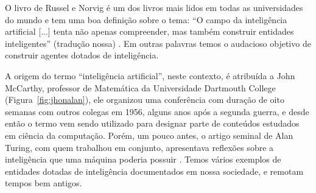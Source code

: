\documentclass[a4paper,12pt]{book}
\begin{document}
O livro de Russel e Norvig é um dos livros mais lidos em todas as universidades do mundo e tem uma boa definição sobre o tema: ``O campo da inteligência artificial [...] tenta não apenas compreender, mas também construir entidades inteligentes'' (tradução nossa) \cite{norvig2002}.  Em outras palavras temos o audacioso objetivo de construir agentes dotados de inteligência.

A origem do termo ``inteligência artificial'', neste contexto, é atribuída a John McCarthy, professor de Matemática da Universidade Dartmouth College \cite{blipblog} (Figura~\ref{fig:jhonalan}), ele organizou uma conferência com duração de oito semanas com outros colegas em 1956, alguns anos após a segunda guerra, e desde então o termo vem sendo utilizado para designar parte de conteúdos estudados em ciência da computação. Porém, um pouco antes, o artigo seminal de Alan Turing, com quem trabalhou em conjunto, apresentava reflexões sobre a inteligência que uma máquina poderia possuir \cite{Turing1950}. Temos vários exemplos de entidades dotadas de inteligência documentados em nossa sociedade, e remotam tempos bem antigos.
\end{document}
